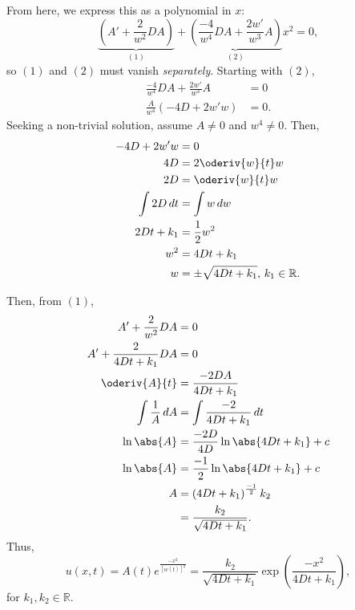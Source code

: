 \documentclass[11pt]{article}
\begin{document}
From here, we express this as a polynomial in \(x\):
\[
    \underbrace{\left(A' + \frac{2}{w^{2}}DA\right)}_{(1)}
    +
    \underbrace{\left(\frac{-4}{w^{4}} DA + \frac{2w'}{w^{3}}A\right)}_{(2)} x^{2}
    = 0,
\]
so \((1)\) and \((2)\) must vanish \emph{separately}.
Starting with \((2)\),
\begin{align*}
    \frac{-4}{w^{4}}DA + \frac{2w'}{w^{3}}A &= 0 \\
    \frac{A}{w^{4}} \left(-4D + 2w' w\right) &= 0.
\end{align*}
Seeking a non-trivial solution, assume \(A \neq 0\) and \(w^{4} \neq 0\). Then,
\begin{align*}
    -4D + 2 w' w &= 0 \\
    4D &= 2 \oderiv{w}{t} w \\
    2D &= \oderiv{w}{t} w \\
    \int 2D \,dt &= \int w \,dw \\
    2Dt + k_1 &= \frac{1}{2} w^{2} \\
    w^{2} &= 4Dt + k_1 \\
    w &= \pm \sqrt{4Dt + k_1}, \, k_1 \in \mathbb{R}.
\end{align*}

Then, from \((1)\),
\begin{align*}
    A' + \frac{2}{w^{2}}DA &= 0 \\
    A' + \frac{2}{4Dt + k_1} DA &= 0 \\
    \oderiv{A}{t} &= \frac{-2DA}{4Dt + k_1} \\
    \int \frac{1}{A} \,dA &= \int \frac{-2}{4Dt + k_1} \,dt \\
    \ln \abs{A} &= \frac{-2D}{4D} \ln \abs{4Dt + k_1} + c \\
    \ln \abs{A} &= \frac{-1}{2} \ln \abs{4Dt + k_1} + c \\
    A &= \left(4Dt + k_1\right)^{\frac{-1}{2}} k_2 \\
    &= \frac{k_2}{\sqrt{4Dt + k_1}}.
\end{align*}
Thus, 
\[
    u(x, t) = A(t) e^{\frac{-x^{2}}{[w(t)]^{2}}} = \frac{k_2}{\sqrt{4Dt + k_1}} \exp\left(\frac{-x^{2}}{4Dt + k_1}\right),
\]
for \(k_1, k_2 \in \mathbb{R}\).
\end{document}
